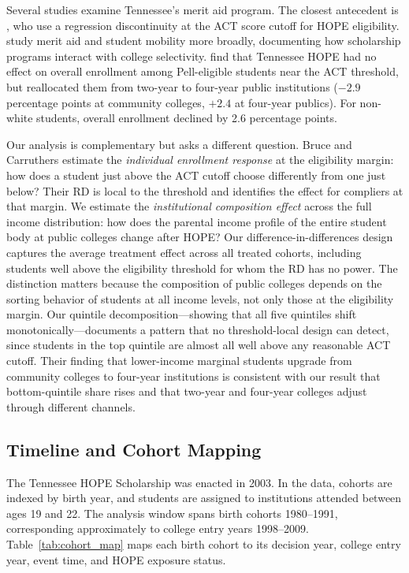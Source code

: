 Several studies examine Tennessee's merit aid program. The closest
antecedent is \textcite{bruce2014jackpot}, who use a regression
discontinuity at the ACT score cutoff for HOPE eligibility.
\textcite{chakrabarti2022merit} study merit aid and student mobility
more broadly, documenting how scholarship programs interact with college
selectivity. \textcite{bruce2014jackpot} find that Tennessee HOPE had no
effect on overall enrollment among Pell-eligible students near the ACT
threshold, but reallocated them from two-year to four-year public
institutions ($-2.9$ percentage points at community colleges, $+2.4$ at
four-year publics). For non-white students, overall enrollment declined
by 2.6 percentage points.

Our analysis is complementary but asks a different question. Bruce and
Carruthers estimate the \emph{individual enrollment response} at the
eligibility margin: how does a student just above the ACT cutoff choose
differently from one just below? Their RD is local to the threshold and
identifies the effect for compliers at that margin. We estimate the
\emph{institutional composition effect} across the full income
distribution: how does the parental income profile of the entire student
body at public colleges change after HOPE? Our
difference-in-differences design captures the average treatment effect
across all treated cohorts, including students well above the
eligibility threshold for whom the RD has no power. The distinction
matters because the composition of public colleges depends on the
sorting behavior of students at all income levels, not only those at
the eligibility margin. Our quintile decomposition---showing that all
five quintiles shift monotonically---documents a pattern that no
threshold-local design can detect, since students in the top quintile
are almost all well above any reasonable ACT cutoff. Their finding that
lower-income marginal students upgrade from community colleges to
four-year institutions is consistent with our result that bottom-quintile
share rises and that two-year and four-year colleges adjust through
different channels.

\subsection{Timeline and Cohort Mapping}
\label{sec:background_timeline}

The Tennessee HOPE Scholarship was enacted in 2003. In the
\textcite{chetty2020mobility} data, cohorts are indexed by birth year,
and students are assigned to institutions attended between ages 19 and
22. The analysis window spans birth cohorts 1980--1991, corresponding
approximately to college entry years 1998--2009.
Table~\ref{tab:cohort_map} maps each birth cohort to its decision year,
college entry year, event time, and HOPE exposure status.

